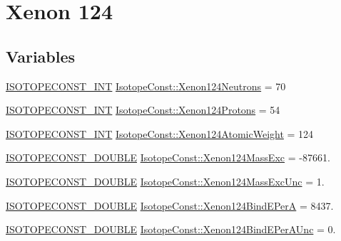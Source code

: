 \hypertarget{group___isotope_const-_xenon-_xe124}{}\section{Xenon 124}
\label{group___isotope_const-_xenon-_xe124}
\subsection*{Variables}
\begin{DoxyCompactItemize}
\item 
\mbox{\hyperlink{group___isotope_const-_macros_ga5f18360b3e99483a35c32d789e62621c}{I\+S\+O\+T\+O\+P\+E\+C\+O\+N\+S\+T\+\_\+\+I\+NT}} \mbox{\hyperlink{group___isotope_const-_xenon-_xe124_gad919d0699883366fc281cda225201f76}{Isotope\+Const\+::\+Xenon124\+Neutrons}} = 70
\item 
\mbox{\hyperlink{group___isotope_const-_macros_ga5f18360b3e99483a35c32d789e62621c}{I\+S\+O\+T\+O\+P\+E\+C\+O\+N\+S\+T\+\_\+\+I\+NT}} \mbox{\hyperlink{group___isotope_const-_xenon-_xe124_gaae1d6b37c7b91a01d35e4b854f6ba24e}{Isotope\+Const\+::\+Xenon124\+Protons}} = 54
\item 
\mbox{\hyperlink{group___isotope_const-_macros_ga5f18360b3e99483a35c32d789e62621c}{I\+S\+O\+T\+O\+P\+E\+C\+O\+N\+S\+T\+\_\+\+I\+NT}} \mbox{\hyperlink{group___isotope_const-_xenon-_xe124_ga8fc76b5b8d25dd909ad20d68f76e2492}{Isotope\+Const\+::\+Xenon124\+Atomic\+Weight}} = 124
\item 
\mbox{\hyperlink{group___isotope_const-_macros_ga8f45a7272ce02c0b4c65c44636ed719a}{I\+S\+O\+T\+O\+P\+E\+C\+O\+N\+S\+T\+\_\+\+D\+O\+U\+B\+LE}} \mbox{\hyperlink{group___isotope_const-_xenon-_xe124_gadf00e2a389346b64beef9b15f395bdcb}{Isotope\+Const\+::\+Xenon124\+Mass\+Exc}} = -\/87661.
\item 
\mbox{\hyperlink{group___isotope_const-_macros_ga8f45a7272ce02c0b4c65c44636ed719a}{I\+S\+O\+T\+O\+P\+E\+C\+O\+N\+S\+T\+\_\+\+D\+O\+U\+B\+LE}} \mbox{\hyperlink{group___isotope_const-_xenon-_xe124_ga05e3107a4168bb0f6c19146bb173d35a}{Isotope\+Const\+::\+Xenon124\+Mass\+Exc\+Unc}} = 1.
\item 
\mbox{\hyperlink{group___isotope_const-_macros_ga8f45a7272ce02c0b4c65c44636ed719a}{I\+S\+O\+T\+O\+P\+E\+C\+O\+N\+S\+T\+\_\+\+D\+O\+U\+B\+LE}} \mbox{\hyperlink{group___isotope_const-_xenon-_xe124_gaafc5c6820a7c26827a8e90592a9a5095}{Isotope\+Const\+::\+Xenon124\+Bind\+E\+PerA}} = 8437.
\item 
\mbox{\hyperlink{group___isotope_const-_macros_ga8f45a7272ce02c0b4c65c44636ed719a}{I\+S\+O\+T\+O\+P\+E\+C\+O\+N\+S\+T\+\_\+\+D\+O\+U\+B\+LE}} \mbox{\hyperlink{group___isotope_const-_xenon-_xe124_ga6b62a930a6ea40053816a83197a7d6b5}{Isotope\+Const\+::\+Xenon124\+Bind\+E\+Per\+A\+Unc}} = 0.

\end{DoxyCompactItemize}

